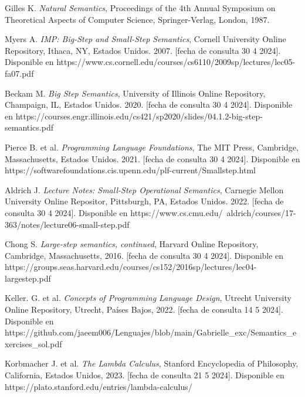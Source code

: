 \begin{thebibliography}{11}
    \bibitem{}
    \label{sec:101}
    \hypertarget{101}{}
    Gilles K. \textit{Natural Semantics}, Proceedings of the 4th Annual Symposium on Theoretical Aspects of Computer Science, Springer-Verlag, London, 1987.

    \bibitem{}
    \label{sec:102}
    \hypertarget{102}{}
    Myers A. \textit{IMP: Big-Step and Small-Step Semantics}, Cornell University Online Repository,  Ithaca, NY, Estados Unidos. 2007. [fecha de consulta 30 4 2024]. Disponible en https://www.cs.cornell.edu/courses/cs6110/2009sp/lectures/lec05-fa07.pdf

    \bibitem{}
    \label{sec:103}
    \hypertarget{103}{}
    Beckam M. \textit{Big Step Semantics}, University of Illinois Online Repository, Champaign, IL, Estados Unidos. 2020. [fecha de consulta 30 4 2024]. Disponible en  https://courses.engr.illinois.edu/cs421/sp2020/slides/04.1.2-big-step-semantics.pdf

    \bibitem{}
    \label{sec:104}
    \hypertarget{104}{}
    Pierce B. et al. \textit{Programming Language Foundations}, The MIT Press, Cambridge, Massachusetts, Estados Unidos. 2021. [fecha de consulta 30 4 2024]. Disponible en  https://softwarefoundations.cis.upenn.edu/plf-current/Smallstep.html

    \bibitem{}
    \label{sec:105}
    \hypertarget{105}{}
    Aldrich J. \textit{Lecture Notes: Small-Step Operational Semantics}, Carnegie Mellon University Online Repositor, Pittsburgh, PA, Estados Unidos. 2022.  [fecha de consulta 30 4 2024]. Disponible en https://www.cs.cmu.edu/~aldrich/courses/17-363/notes/lecture06-small-step.pdf

     \bibitem{}
    \label{sec:106}
    \hypertarget{106}{}
    Chong S. \textit{Large-step semantics, continued},  Harvard Online Repository, Cambridge, Massachusetts, 2016.  [fecha de consulta 30 4 2024]. Disponible en  https://groups.seas.harvard.edu/courses/cs152/2016sp/lectures/lec04-largestep.pdf

     \bibitem{}
    \label{sec:107}
    \hypertarget{107}{}
    Keller. G. et al. \textit{Concepts of Programming Language Design}, Utrecht University Online Repository, Utrecht, Países Bajos, 2022.  [fecha de consulta 14 5 2024]. Disponible en https://github.com/jaeem006/Lenguajes/blob/main/Gabrielle\_exc/Semantics\_exercises\_sol.pdf

     \bibitem{}
    \label{sec:108}
    \hypertarget{108}{}
    Korbmacher J. et al. \textit{The Lambda Calculus}, Stanford Encyclopedia of Philosophy, California, Estados Unidos, 2023.  [fecha de consulta 21 5 2024]. Disponible en https://plato.stanford.edu/entries/lambda-calculus/


\end{thebibliography}
